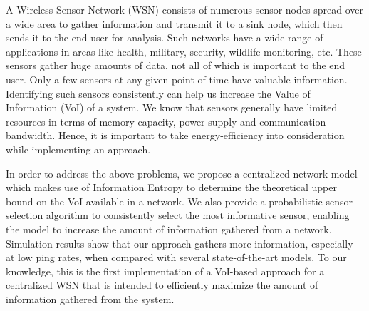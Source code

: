 A Wireless Sensor Network (WSN) consists of numerous sensor nodes
spread over a wide area to gather information and transmit it to a
sink node, which then sends it to the end user for analysis. Such
networks have a wide range of applications in areas like health,
military, security, wildlife monitoring, etc. These sensors gather
huge amounts of data, not all of which is important to the end
user. Only a few sensors at any given point of time have valuable
information.  Identifying such sensors consistently can help us
increase the Value of Information (VoI) of a system. We know that
sensors generally have limited resources in terms of memory capacity,
power supply and communication bandwidth. Hence, it is important to
take energy-efficiency into consideration while implementing an
approach.

In order to address the above problems, we propose a centralized
network model which makes use of Information Entropy to determine the
theoretical upper bound on the VoI available in a network. We also
provide a probabilistic sensor selection algorithm to consistently
select the most informative sensor, enabling the model to increase the
amount of information gathered from a network. Simulation results show
that our approach gathers more information, especially at low ping
rates, when compared with several state-of-the-art models. To our
knowledge, this is the first implementation of a VoI-based approach
for a centralized WSN that is intended to efficiently maximize the
amount of information gathered from the system.